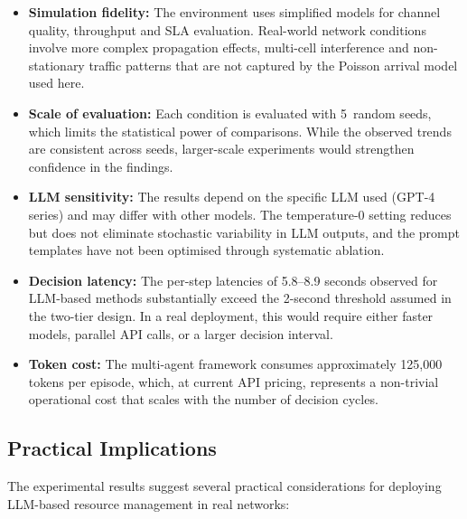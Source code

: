 \begin{itemize}
    \item \textbf{Simulation fidelity:} The environment uses simplified models for channel quality, throughput and SLA evaluation. Real-world network conditions involve more complex propagation effects, multi-cell interference and non-stationary traffic patterns that are not captured by the Poisson arrival model used here.

    \item \textbf{Scale of evaluation:} Each condition is evaluated with 5~random seeds, which limits the statistical power of comparisons. While the observed trends are consistent across seeds, larger-scale experiments would strengthen confidence in the findings.

    \item \textbf{LLM sensitivity:} The results depend on the specific LLM used (GPT-4 series) and may differ with other models. The temperature-0 setting reduces but does not eliminate stochastic variability in LLM outputs, and the prompt templates have not been optimised through systematic ablation.

    \item \textbf{Decision latency:} The per-step latencies of 5.8--8.9 seconds observed for LLM-based methods substantially exceed the 2-second threshold assumed in the two-tier design. In a real deployment, this would require either faster models, parallel API calls, or a larger decision interval.

    \item \textbf{Token cost:} The multi-agent framework consumes approximately 125{,}000 tokens per episode, which, at current API pricing, represents a non-trivial operational cost that scales with the number of decision cycles.
\end{itemize}

\subsection{Practical Implications}

The experimental results suggest several practical considerations for deploying LLM-based resource management in real networks:

